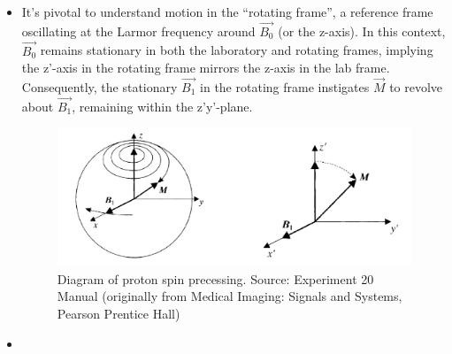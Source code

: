 \documentclass{article}
\begin{document}
\begin{itemize}
    \item It's pivotal to understand motion in the “rotating frame”, a reference frame oscillating at the Larmor frequency around \( \vec{B_0} \) (or the z-axis). In this context, \( \vec{B_0} \) remains stationary in both the laboratory and rotating frames, implying the z'-axis in the rotating frame mirrors the z-axis in the lab frame. Consequently, the stationary \( \vec{B_1} \) in the rotating frame instigates \( \vec{M} \) to revolve about \( \vec{B_1} \), remaining within the z'y'-plane.
    \begin{figure}[h]
    \centering
    \includegraphics[scale = 0.2]{../images/diagram1}
    \caption{Diagram of proton spin precessing. Source: Experiment 20 Manual (originally from Medical Imaging: Signals and Systems, Pearson Prentice Hall)}
    \label{fig:diagram1}
    \end{figure}
\item \end{itemize}
\end{document}
